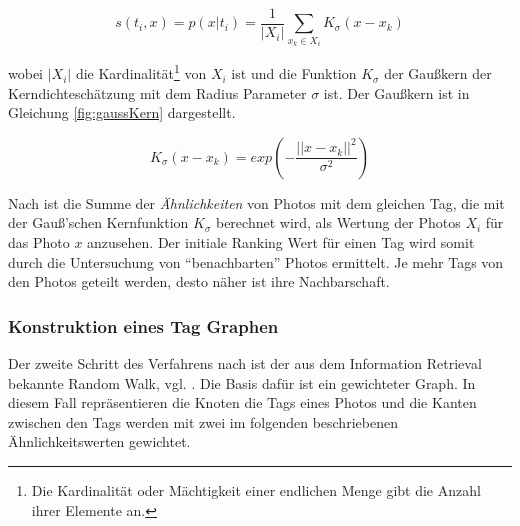 \begin{figure}[hptb]
  \begin{equation}
  \label{fig:kdeRelevance}
    s(t_i, x) = p(x \vert t_i) = \frac{1}{ \vert X_i \vert} \sum_{x_k \in X_i} K_{\sigma}(x - x_k)
  \end{equation}
\end{figure}

wobei $\vert X_i \vert$ die Kardinalität\footnote{Die Kardinalität oder Mächtigkeit einer endlichen Menge gibt die Anzahl ihrer Elemente an.} von $X_i$ ist und die Funktion $K_\sigma$ der Gaußkern der Kerndichteschätzung mit dem Radius Parameter $\sigma$ ist. Der Gaußkern ist in Gleichung \ref{fig:gaussKern} dargestellt.
\begin{figure}[hptb]
  \begin{equation}
  \label{fig:gaussKern}
    K_{\sigma}(x - x_k) = exp(-\frac{\vert \vert x - x_k \vert \vert^2}{ \sigma^2})
  \end{equation}
\end{figure}

Nach \cite{ranking} ist die Summe der \emph{Ähnlichkeiten} von Photos mit dem gleichen Tag, die mit der Gauß'schen Kernfunktion $K_\sigma$ berechnet wird, als Wertung der Photos $X_i$ für das Photo $x$ anzusehen. Der initiale Ranking Wert für einen Tag wird somit durch die Untersuchung von ``benachbarten'' Photos ermittelt. Je mehr Tags von den Photos geteilt werden, desto näher ist ihre Nachbarschaft.






\subsubsection{Konstruktion eines Tag Graphen} %
\label{ssub:konstruktion_eines_tag_graphen}

Der zweite Schritt des Verfahrens nach \cite{ranking} ist der aus dem Information Retrieval bekannte Random Walk, vgl. \cite{bingLiu}. Die Basis dafür ist ein gewichteter Graph. In diesem Fall repräsentieren die Knoten die Tags eines Photos und die Kanten zwischen den Tags werden mit zwei im folgenden beschriebenen Ähnlichkeitswerten gewichtet.

